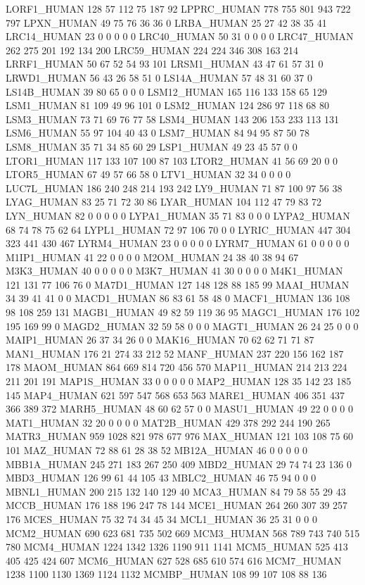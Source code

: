 LORF1_HUMAN	128	57	112	75	187	92
LPPRC_HUMAN	778	755	801	943	722	797
LPXN_HUMAN	49	75	76	36	36	0
LRBA_HUMAN	25	27	42	38	35	41
LRC14_HUMAN	23	0	0	0	0	0
LRC40_HUMAN	50	31	0	0	0	0
LRC47_HUMAN	262	275	201	192	134	200
LRC59_HUMAN	224	224	346	308	163	214
LRRF1_HUMAN	50	67	52	54	93	101
LRSM1_HUMAN	43	47	61	57	31	0
LRWD1_HUMAN	56	43	26	58	51	0
LS14A_HUMAN	57	48	31	60	37	0
LS14B_HUMAN	39	80	65	0	0	0
LSM12_HUMAN	165	116	133	158	65	129
LSM1_HUMAN	81	109	49	96	101	0
LSM2_HUMAN	124	286	97	118	68	80
LSM3_HUMAN	73	71	69	76	77	58
LSM4_HUMAN	143	206	153	233	113	131
LSM6_HUMAN	55	97	104	40	43	0
LSM7_HUMAN	84	94	95	87	50	78
LSM8_HUMAN	35	71	34	85	60	29
LSP1_HUMAN	49	23	45	57	0	0
LTOR1_HUMAN	117	133	107	100	87	103
LTOR2_HUMAN	41	56	69	20	0	0
LTOR5_HUMAN	67	49	57	66	58	0
LTV1_HUMAN	32	34	0	0	0	0
LUC7L_HUMAN	186	240	248	214	193	242
LY9_HUMAN	71	87	100	97	56	38
LYAG_HUMAN	83	25	71	72	30	86
LYAR_HUMAN	104	112	47	79	83	72
LYN_HUMAN	82	0	0	0	0	0
LYPA1_HUMAN	35	71	83	0	0	0
LYPA2_HUMAN	68	74	78	75	62	64
LYPL1_HUMAN	72	97	106	70	0	0
LYRIC_HUMAN	447	304	323	441	430	467
LYRM4_HUMAN	23	0	0	0	0	0
LYRM7_HUMAN	61	0	0	0	0	0
M1IP1_HUMAN	41	22	0	0	0	0
M2OM_HUMAN	24	38	40	38	94	67
M3K3_HUMAN	40	0	0	0	0	0
M3K7_HUMAN	41	30	0	0	0	0
M4K1_HUMAN	121	131	77	106	76	0
MA7D1_HUMAN	127	148	128	88	185	99
MAAI_HUMAN	34	39	41	41	0	0
MACD1_HUMAN	86	83	61	58	48	0
MACF1_HUMAN	136	108	98	108	259	131
MAGB1_HUMAN	49	82	59	119	36	95
MAGC1_HUMAN	176	102	195	169	99	0
MAGD2_HUMAN	32	59	58	0	0	0
MAGT1_HUMAN	26	24	25	0	0	0
MAIP1_HUMAN	26	37	34	26	0	0
MAK16_HUMAN	70	62	62	71	71	87
MAN1_HUMAN	176	21	274	33	212	52
MANF_HUMAN	237	220	156	162	187	178
MAOM_HUMAN	864	669	814	720	456	570
MAP11_HUMAN	214	213	224	211	201	191
MAP1S_HUMAN	33	0	0	0	0	0
MAP2_HUMAN	128	35	142	23	185	145
MAP4_HUMAN	621	597	547	568	653	563
MARE1_HUMAN	406	351	437	366	389	372
MARH5_HUMAN	48	60	62	57	0	0
MASU1_HUMAN	49	22	0	0	0	0
MAT1_HUMAN	32	20	0	0	0	0
MAT2B_HUMAN	429	378	292	244	190	265
MATR3_HUMAN	959	1028	821	978	677	976
MAX_HUMAN	121	103	108	75	60	101
MAZ_HUMAN	72	88	61	28	38	52
MB12A_HUMAN	46	0	0	0	0	0
MBB1A_HUMAN	245	271	183	267	250	409
MBD2_HUMAN	29	74	74	23	136	0
MBD3_HUMAN	126	99	61	44	105	43
MBLC2_HUMAN	46	75	94	0	0	0
MBNL1_HUMAN	200	215	132	140	129	40
MCA3_HUMAN	84	79	58	55	29	43
MCCB_HUMAN	176	188	196	247	78	144
MCE1_HUMAN	264	260	307	39	257	176
MCES_HUMAN	75	32	74	34	45	34
MCL1_HUMAN	36	25	31	0	0	0
MCM2_HUMAN	690	623	681	735	502	669
MCM3_HUMAN	568	789	743	740	515	780
MCM4_HUMAN	1224	1342	1326	1190	911	1141
MCM5_HUMAN	525	413	405	425	424	607
MCM6_HUMAN	627	528	685	610	574	616
MCM7_HUMAN	1238	1100	1130	1369	1124	1132
MCMBP_HUMAN	108	99	107	108	88	136
